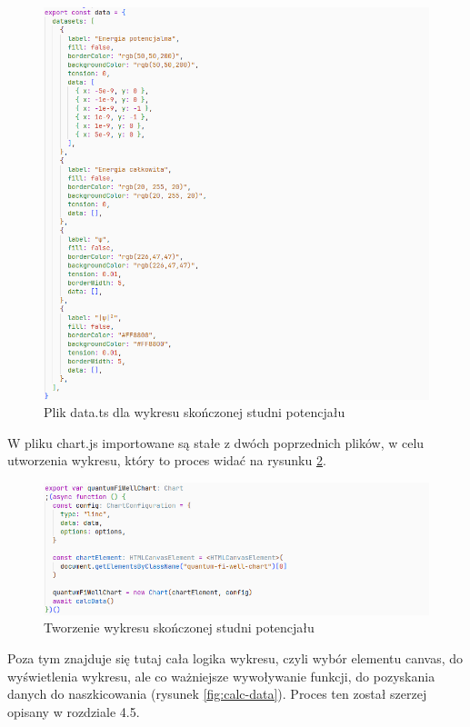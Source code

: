 \documentclass{SGGW-thesis}
\begin{document}
	\begin{figure}[H]
	\includegraphics[width=\textwidth,height=\textheight,keepaspectratio]{data.png} 
	\caption{Plik data.ts dla wykresu skończonej studni potencjału}
	\label{fig:data.ts}
	\end{figure}
	
	W pliku chart.js importowane są stałe z dwóch poprzednich plików, w celu utworzenia wykresu, który to proces widać na rysunku \ref{fig:new-chart}. 
	
	\begin{figure}[H]
	\includegraphics[width=\textwidth,height=\textheight,keepaspectratio]{new chart.png} 
	\caption{Tworzenie wykresu skończonej studni potencjału}
	\label{fig:new-chart}
	\end{figure}
	
	Poza tym znajduje się tutaj cała logika wykresu, czyli wybór elementu canvas, do wyświetlenia wykresu, ale co ważniejsze wywoływanie funkcji, do pozyskania danych do naszkicowania (rysunek \ref{fig:calc-data}). Proces ten został szerzej opisany w rozdziale 4.5. 
	
\end{document}
